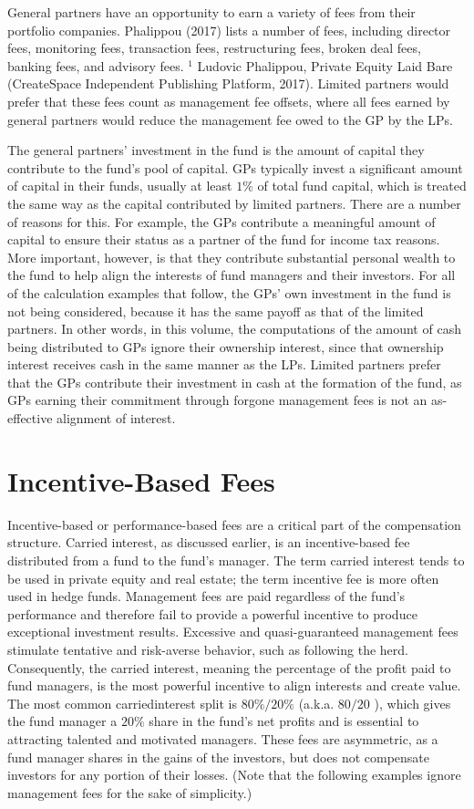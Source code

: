 \documentclass[11pt]{article}
\begin{document}
General partners have an opportunity to earn a variety of fees from their portfolio companies. Phalippou (2017) lists a number of fees, including director fees, monitoring fees, transaction fees, restructuring fees, broken deal fees, banking fees, and advisory fees. ${ }^{1}$ Ludovic Phalippou, Private Equity Laid Bare (CreateSpace Independent Publishing Platform, 2017). Limited partners would prefer that these fees count as management fee offsets, where all fees earned by general partners would reduce the management fee owed to the GP by the LPs.

The general partners' investment in the fund is the amount of capital they contribute to the fund's pool of capital. GPs typically invest a significant amount of capital in their funds, usually at least $1 \%$ of total fund capital, which is treated the same way as the capital contributed by limited partners. There are a number of reasons for this. For example, the GPs contribute a meaningful amount of capital to ensure their status as a partner of the fund for income tax reasons. More important, however, is that they contribute substantial personal wealth to the fund to help align the interests of fund managers and their investors. For all of the calculation examples that follow, the GPs' own investment in the fund is not being considered, because it has the same payoff as that of the limited partners. In other words, in this volume, the computations of the amount of cash being distributed to GPs ignore their ownership interest, since that ownership interest receives cash in the same manner as the LPs. Limited partners prefer that the GPs contribute their investment in cash at the formation of the fund, as GPs earning their commitment through forgone management fees is not an as-effective alignment of interest.

\section*{Incentive-Based Fees}
Incentive-based or performance-based fees are a critical part of the compensation structure. Carried interest, as discussed earlier, is an incentive-based fee distributed from a fund to the fund's manager. The term carried interest tends to be used in private equity and real estate; the term incentive fee is more often used in hedge funds. Management fees are paid regardless of the fund's performance and therefore fail to provide a powerful incentive to produce exceptional investment results. Excessive and quasi-guaranteed management fees stimulate tentative and risk-averse behavior, such as following the herd. Consequently, the carried interest, meaning the percentage of the profit paid to fund managers, is the most powerful incentive to align interests and create value. The most common carriedinterest split is $80 \% / 20 \%$ (a.k.a. $80 / 20$ ), which gives the fund manager a $20 \%$ share in the fund's net profits and is essential to attracting talented and motivated managers. These fees are asymmetric, as a fund manager shares in the gains of the investors, but does not compensate investors for any portion of their losses. (Note that the following examples ignore management fees for the sake of simplicity.)
\end{document}
